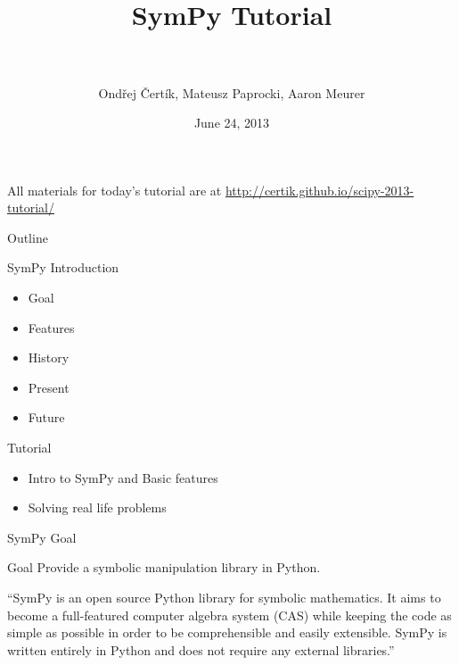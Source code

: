 \documentclass[xcolor=svgnames]{beamer}
\title[SymPy\hspace{4em}\insertframenumber/
\inserttotalframenumber]{~\\ SymPy Tutorial \\~}
\author[O. Čertík, M. Paprocki, A. Meurer]
{Ondřej Čertík, Mateusz Paprocki, Aaron Meurer}
\institute{\pgfuseimage{mylogo}}
\date{June 24, 2013}
\begin{document}
\begin{frame}
  \maketitle
\begin{center}
\normalsize All materials for today's tutorial are at \url{http://certik.github.io/scipy-2013-tutorial/}
\end{center}
\end{frame}

\begin{frame}{Outline}
  \begin{block}{SymPy Introduction}
    \begin{itemize}
    \item Goal
    \item Features
    \item History
    \item Present
    \item Future
    \end{itemize}
  \end{block}

  \begin{block}{Tutorial}
    \begin{itemize}
    \item Intro to SymPy and Basic features
    \item Solving real life problems
    \end{itemize}
  \end{block}
\end{frame}

\begin{frame}{SymPy Goal}
  \begin{block}{Goal}
    Provide a symbolic manipulation library in Python.
  \end{block}
  \pause
  \begin{block}

    ``SymPy is an open source Python library for symbolic mathematics. It aims to
    become a full-featured computer algebra system (CAS) while keeping the code as
    simple as possible in order to be comprehensible and easily extensible. SymPy
    is written entirely in Python and does not require any external libraries.''

  \end{block}
\end{frame}
\end{document}
